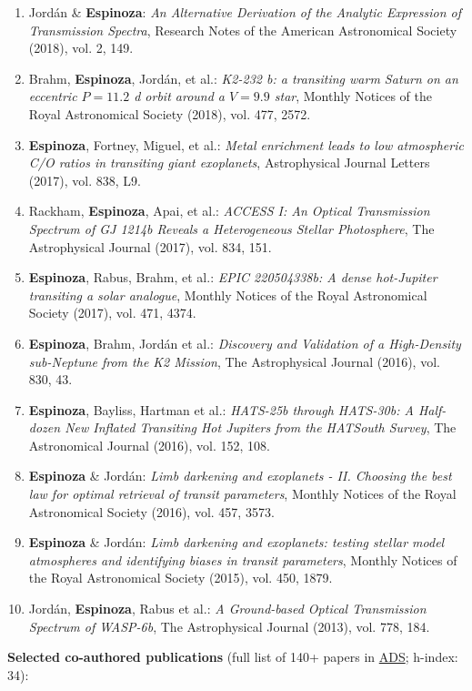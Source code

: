 \documentclass[12pt, a4paper]{article} %
\begin{document}
\begin{flushleft}
\begin{enumerate}
\item Jord\'an \& \textbf{Espinoza}: \textit{An Alternative Derivation of the Analytic Expression of Transmission Spectra}, Research Notes of the American Astronomical Society (2018), vol. 2, 149.
\item Brahm, \textbf{Espinoza}, Jord\'an, et al.: \textit{K2-232 b: a transiting warm Saturn on an eccentric $P = 11.2$ d orbit around a $V = 9.9$ star}, Monthly Notices of the Royal Astronomical Society (2018), vol. 477, 2572.
\item \textbf{Espinoza}, Fortney, Miguel, et al.: \textit{Metal enrichment leads to low atmospheric C/O ratios in transiting giant exoplanets}, Astrophysical Journal Letters (2017), vol. 838, L9.
\item Rackham, \textbf{Espinoza}, Apai, et al.: \textit{ACCESS I: An Optical Transmission Spectrum of GJ 1214b Reveals a Heterogeneous Stellar Photosphere}, The Astrophysical Journal (2017), vol. 834, 151.
\item \textbf{Espinoza}, Rabus, Brahm, et al.: \textit{EPIC 220504338b: A dense hot-Jupiter transiting a solar analogue}, Monthly Notices of the Royal Astronomical Society (2017), vol. 471, 4374.
\item \textbf{Espinoza}, Brahm, Jord\'an et al.: \textit{Discovery and Validation of a High-Density sub-Neptune from the K2 Mission}, The Astrophysical Journal (2016), vol. 830, 43.
\item \textbf{Espinoza}, Bayliss, Hartman et al.: \textit{HATS-25b through HATS-30b: A Half-dozen New Inflated Transiting Hot Jupiters from the HATSouth Survey}, The Astronomical Journal (2016), vol. 152, 108.
\item \textbf{Espinoza} \& Jord\'an: \textit{Limb darkening and exoplanets - II. Choosing the best law for optimal retrieval of transit parameters}, Monthly Notices of the Royal Astronomical Society (2016), vol. 457, 3573.
\item \textbf{Espinoza} \& Jord\'an: \textit{Limb darkening and exoplanets: testing stellar model atmospheres and identifying biases in transit parameters}, Monthly Notices of the Royal Astronomical Society (2015), vol. 450, 1879.
\item Jord\'an, \textbf{Espinoza}, Rabus et al.: \textit{A Ground-based Optical Transmission Spectrum of WASP-6b}, The Astrophysical Journal (2013), vol. 778, 184.
\end{enumerate}

\textbf{Selected co-authored publications} (full list of 140+ papers in \href{https://ui.adsabs.harvard.edu/public-libraries/JAL40dT5ToGup2Omjvc3Ag}{ADS}; h-index: 34):
\begin{itemize}
\setlength\itemsep{0.05cm}


\end{itemize}
\end{flushleft}
\end{document}
